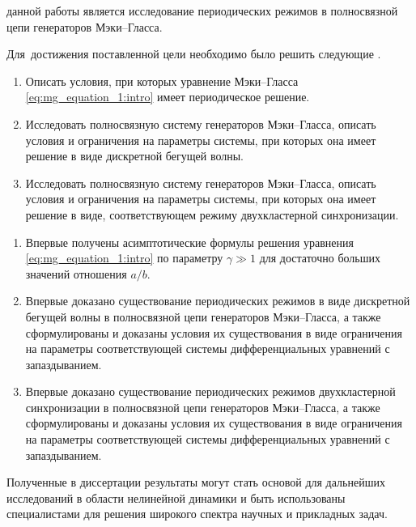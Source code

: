 
{\aim} данной работы является исследование периодических режимов в полносвязной цепи генераторов Мэки--Гласса.

Для~достижения поставленной цели необходимо было решить следующие {\tasks}.
\begin{enumerate}[beginpenalty=10000] %
	\item Описать условия, при которых уравнение Мэки--Гласса \eqref{eq:mg_equation_1:intro} имеет периодическое решение.
	\item Исследовать полносвязную систему генераторов Мэки--Гласса, описать условия и ограничения на параметры системы, при которых она имеет решение в виде дискретной бегущей волны.
	\item Исследовать полносвязную систему генераторов Мэки--Гласса, описать условия и ограничения на параметры системы, при которых она имеет решение в виде, соответствующем режиму двухкластерной синхронизации.
\end{enumerate}


{\novelty}
\begin{enumerate}[beginpenalty=10000] %
  \item Впервые получены асимптотические формулы решения уравнения \eqref{eq:mg_equation_1:intro} по параметру $\gamma \gg 1$ для достаточно больших значений отношения $a / b$.
  \item Впервые доказано существование периодических режимов в виде дискретной бегущей волны в полносвязной цепи генераторов Мэки--Гласса, а также сформулированы и доказаны условия их существования в виде ограничения на параметры соответствующей системы дифференциальных уравнений с запаздыванием.
  \item Впервые доказано существование периодических режимов двухкластерной синхронизации в полносвязной цепи генераторов Мэки--Гласса, а также сформулированы и доказаны условия их существования в виде ограничения на параметры соответствующей системы дифференциальных уравнений с запаздыванием.
\end{enumerate}

{\influence} Полученные в диссертации результаты могут стать основой для дальнейших исследований в области нелинейной динамики и быть использованы специалистами для решения широкого спектра научных и прикладных задач.

